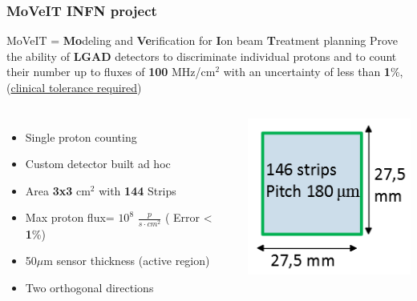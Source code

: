 \documentclass[aspectratio=169]{beamer}
\begin{document}
	\begin{frame}
	\frametitle{MoVeIT INFN project}
	\begin{center}
		{\Large \color{blue} MoVeIT = \textbf{Mo}deling and \textbf{Ve}rification for \textbf{I}on beam \textbf{T}reatment planning }
		\newline
		Prove the ability of \textbf{LGAD} detectors to discriminate individual protons and to count their number up to fluxes of \textbf{100} MHz/cm$^2$ with an uncertainty of {\color{blue}less than \textbf{1}\%}, (\underline{clinical tolerance required})
	\end{center}
	\begin{columns}
		\begin{itemize}
			\item Single proton counting
			\item Custom detector built ad hoc
			\item Area \textbf{3x3} cm${}^2$ with \textbf{144} Strips
			\item Max proton flux= $10^8$ $\frac{p}{s \cdot cm^2}$ ({\color{blue} Error < \textbf{1}\%})
			\item 50$\mu$m sensor thickness (active region)
			\item Two orthogonal directions
		\end{itemize}
		\begin{center}
			\includegraphics[width=0.7 \textwidth]{IMG/Detector.PNG}
		\end{center}
	\end{columns}
	\end{frame}
\end{document}
